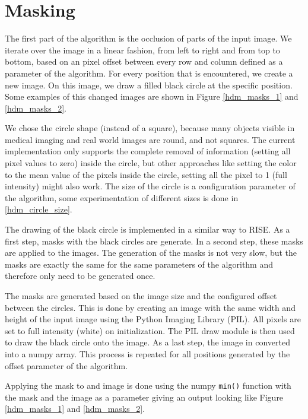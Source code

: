 \section{Masking}

The first part of the algorithm is the occlusion of parts of the input image.
We iterate over the image in a linear fashion, from left to right and from top to bottom, based on an pixel offset between every row and column defined as a parameter of the algorithm.
For every position that is encountered, we create a new image. On this image, we draw a filled black circle at the specific position.
Some examples of this changed images are shown in Figure \ref{hdm_masks_1} and \ref{hdm_masks_2}.

We chose the circle shape (instead of a square), because many objects visible in medical imaging and real world images are round, and not squares.
The current implementation only supports the complete removal of information (setting all pixel values to zero) inside the circle, but other approaches like
setting the color to the mean value of the pixels inside the circle, setting all the pixel to 1 (full intensity) might also work.
The size of the circle is a configuration parameter of the algorithm, some experimentation of different sizes is done in \autoref{hdm_circle_size}.

The drawing of the black circle is implemented in a similar way to RISE. As a first step, masks with the black circles are generate. In a second step,
these masks are applied to the images. The generation of the masks is not very slow, but the masks are exactly the same for the same parameters of the algorithm and therefore
only need to be generated once.

The masks are generated based on the image size and the configured offset between the circles.
This is done by creating an image with the same width and height of the input image using the Python Imaging Library (PIL). All pixels are set to full intensity (white) on initialization.
The PIL draw module is then used to draw the black circle onto the image. As a last step, the image in converted into a numpy array. This process is repeated for all positions generated
by the offset parameter of the algorithm.

Applying the mask to and image is done using the numpy \texttt{min()} function with the mask and the image as a parameter giving an output looking like Figure \ref{hdm_masks_1} and \ref{hdm_masks_2}.

